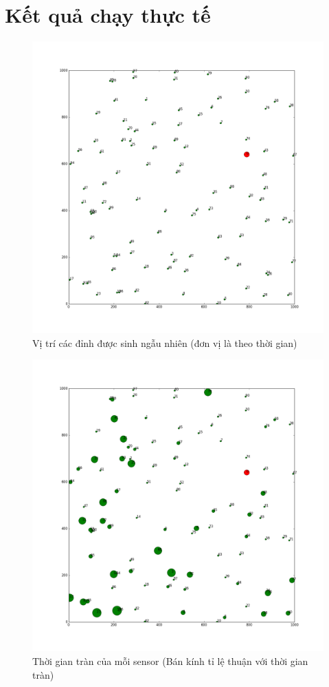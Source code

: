 \documentclass[12pt]{report}
\begin{document}
\section{Kết quả chạy thực tế}
\begin{figure}[H]
\centering
\caption{Vị trí các đỉnh được sinh ngẫu nhiên (đơn vị là theo thời gian)}
\includegraphics[width=\textwidth]{positions.png}
\end{figure}

\begin{figure}[H]
\centering
\caption{Thời gian tràn của mỗi sensor (Bán kính tỉ lệ thuận với thời gian tràn)}
\includegraphics[width=\textwidth]{overflow.png}
\end{figure}
\end{document}
